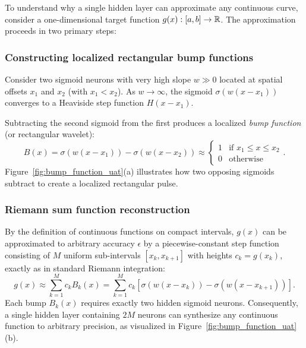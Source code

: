 \documentclass[../../main.tex]{subfiles}
\begin{document}
To understand why a single hidden layer can approximate any continuous curve, consider a one-dimensional target function $g(x): [a, b] \to \mathbb{R}$. The approximation proceeds in two primary steps:

\subsubsection{Constructing localized rectangular bump functions}
Consider two sigmoid neurons with very high slope $w \gg 0$ located at spatial offsets $x_1$ and $x_2$ (with $x_1 < x_2$). As $w \to \infty$, the sigmoid $\sigma(w(x - x_1))$ converges to a Heaviside step function $H(x - x_1)$. 

Subtracting the second sigmoid from the first produces a localized \emph{bump function} (or rectangular wavelet):
\begin{equation}
\label{eq:bump_construction}
B(x) = \sigma(w(x - x_1)) - \sigma(w(x - x_2)) \approx \begin{cases} 1 & \text{if } x_1 \le x \le x_2 \\ 0 & \text{otherwise} \end{cases}.
\end{equation}
Figure~\ref{fig:bump_function_uat}(a) illustrates how two opposing sigmoids subtract to create a localized rectangular pulse.

\subsubsection{Riemann sum function reconstruction}
By the definition of continuous functions on compact intervals, $g(x)$ can be approximated to arbitrary accuracy $\epsilon$ by a piecewise-constant step function consisting of $M$ uniform sub-intervals $[x_k, x_{k+1}]$ with heights $c_k = g(x_k)$, exactly as in standard Riemann integration:
\begin{equation}
\label{eq:riemann_uat}
g(x) \approx \sum_{k=1}^M c_k B_k(x) = \sum_{k=1}^M c_k \left[ \sigma(w(x - x_k)) - \sigma(w(x - x_{k+1})) \right].
\end{equation}
Each bump $B_k(x)$ requires exactly two hidden sigmoid neurons. Consequently, a single hidden layer containing $2M$ neurons can synthesize any continuous function to arbitrary precision, as visualized in Figure~\ref{fig:bump_function_uat}(b).
\end{document}
